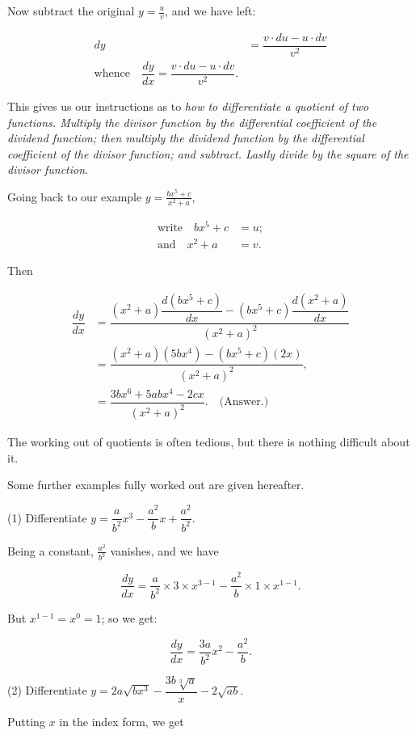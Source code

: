 \documentclass{ximera}
\begin{document}
Now subtract the original $y=\frac{u}{v}$, and we have left:

\begin{align*}
dy &=\dfrac{v\cdot du-u\cdot dv}{v^2}\\
\text{whence}\quad \dfrac{dy}{dx}=\dfrac{v\cdot du−u\cdot dv}{v^2}.
\end{align*}

This gives us our instructions as to \emph{how to differentiate a quotient of two functions. Multiply the divisor 
function by the differential coefficient of the dividend function; then multiply the dividend function by the 
differential coefficient of the divisor function; and subtract. Lastly divide by the square of the divisor function}.

Going back to our example $y=\frac{bx^5+c}{x^2+a}$,

\begin{align*}
\text{write}\quad bx^5+c &=u;\\
\text{and}\quad x^2+a &=v.
\end{align*}

Then

\begin{align*}
\dfrac{dy}{dx} &=\dfrac{(x^2+a)\dfrac{d(bx^5+c)}{dx}−(bx^5+c)\dfrac{d(x^2+a)}{dx}}{(x^2+a)^2}\\
 &=\dfrac{(x^2+a)(5bx^4)−(bx^5+c)(2x)}{(x^2+a)^2},\\
 &=\dfrac{3bx^6+5abx^4−2cx}{(x^2+a)^2}.\quad\text{(Answer.)}
\end{align*}

The working out of quotients is often tedious, but there is nothing difficult about it.

Some further examples fully worked out are given hereafter.

\par\noindent
(1) Differentiate  $y=\dfrac{a}{b^2}x^3−\dfrac{a^2}{b}x+\dfrac{a^2}{b^2}$.


Being a constant, $\frac{a^2}{b^2}$
vanishes, and we have

$$
\dfrac{dy}{dx}=\dfrac{a}{b^2}\times 3\times x^{3−1}−\dfrac{a^2}{b}\times 1\times x^{1−1}.
$$

But $x^{1−1}=x^0=1$; so we get:

$$
\dfrac{dy}{dx}=\dfrac{3a}{b^2}x^2−\dfrac{a^2}{b}.
$$

\par\noindent
(2) Differentiate $y=2a\sqrt{bx^3}−\dfrac{3b\sqrt[3]{a}}{x}−2\sqrt{ab}$.

Putting $x$ in the index form, we get
\end{document}

